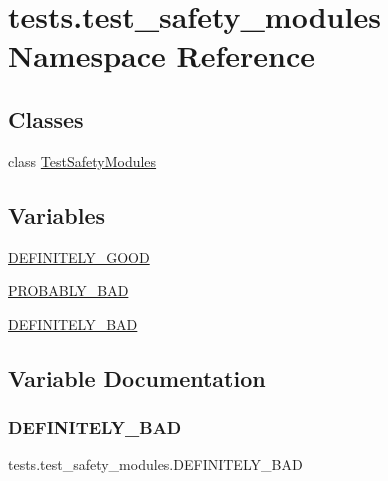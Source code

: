 \hypertarget{namespacetests_1_1test__safety__modules}{}\section{tests.\+test\+\_\+safety\+\_\+modules Namespace Reference}
\label{namespacetests_1_1test__safety__modules}
\subsection*{Classes}
\begin{DoxyCompactItemize}
\item 
class \hyperlink{classtests_1_1test__safety__modules_1_1TestSafetyModules}{Test\+Safety\+Modules}
\end{DoxyCompactItemize}
\subsection*{Variables}
\begin{DoxyCompactItemize}
\item 
\hyperlink{namespacetests_1_1test__safety__modules_aec4de9df0e366a9987a2e98a2e43d64d}{D\+E\+F\+I\+N\+I\+T\+E\+L\+Y\+\_\+\+G\+O\+OD}
\item 
\hyperlink{namespacetests_1_1test__safety__modules_a8f47e2eace0fad7f84da90a1c05b42a3}{P\+R\+O\+B\+A\+B\+L\+Y\+\_\+\+B\+AD}
\item 
\hyperlink{namespacetests_1_1test__safety__modules_a2eba5300880fd55053ef44ff7d81bfde}{D\+E\+F\+I\+N\+I\+T\+E\+L\+Y\+\_\+\+B\+AD}
\end{DoxyCompactItemize}


\subsection{Variable Documentation}
\mbox{\label{namespacetests_1_1test__safety__modules_a2eba5300880fd55053ef44ff7d81bfde}} 
\subsubsection{\texorpdfstring{D\+E\+F\+I\+N\+I\+T\+E\+L\+Y\+\_\+\+B\+AD}{DEFINITELY\_BAD}}
{\footnotesize\ttfamily tests.\+test\+\_\+safety\+\_\+modules.\+D\+E\+F\+I\+N\+I\+T\+E\+L\+Y\+\_\+\+B\+AD}



